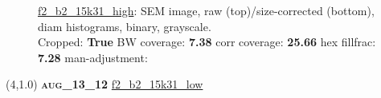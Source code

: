 \begin{figure}[h!]
\label{semimg27}
\caption*{\hyperlink{covtableaug_13_12}{\color{blue} \small \ttfamily f2\_b2\_15k31\_high}: SEM image, raw (top)/size-corrected (bottom), diam histograms, binary, grayscale.\\Cropped: {\bf True} \;\; BW coverage: {\bf 7.38} \:\: corr coverage: {\bf 25.66} \:\: hex fillfrac: {\bf 7.28} \:\: man-adjustment: {\bf \color{blue}{Yes}}}
\end{figure}
\newpage

\begin{textblock}{5}(4,1.0)
{\bf \textsc{aug\_13\_12}}
\hspace{4.5cm}
\hyperlink{covtableaug_13_12}{\color{blue} \large \ttfamily f2\_b2\_15k31\_low}
\end{textblock}

